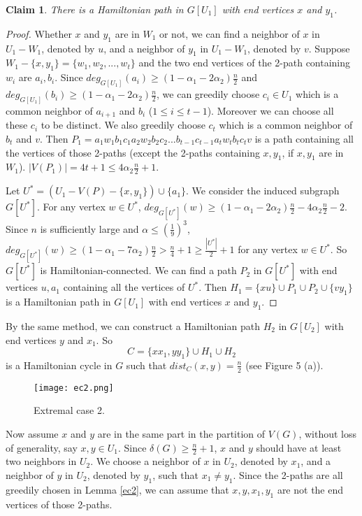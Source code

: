 \documentclass[11pt]{article}
\newtheorem{claim}[lemma]{Claim}
\begin{document}
\begin{claim}\label{hp}
There is a Hamiltonian path in $G[U_1]$ with end vertices $x$ and $y_1$.
\end{claim}
\begin{proof}
Whether $x$ and $y_1$ are in $W_1$ or not, we can find a neighbor of $x$ in $U_1-W_1$, denoted by $u$, and a neighbor of $y_1$ in $U_1-W_1$, denoted by $v$. Suppose $W_1-\{x,y_1\}=\{w_1, w_2,...,w_t\}$ and the two end vertices of the 2-path containing $w_i$ are $a_i,b_i$. Since $deg_{G[U_1]}(a_i)\geq (1-\alpha_1-2\alpha_2)\frac{n}{2}$ and $deg_{G[U_1]}(b_i)\geq (1-\alpha_1-2\alpha_2)\frac{n}{2}$, we can greedily choose $c_i\in U_1$ which is a common neighbor of $a_{i+1}$ and $b_i$ ($1\leq i\leq t-1$). Moreover we can choose all these $c_i$ to be distinct. We also greedily choose $c_t$ which is a common neighbor of $b_t$ and $v$. Then $P_1=a_1w_1b_1c_1a_2w_2b_2c_2...b_{t-1}c_{t-1}a_{t}w_{t}b_{t}c_{t}v$ is a path containing all the vertices of those 2-paths (except the 2-paths containing $x,y_1$, if $x,y_1$ are in $W_1$). $|V(P_1)|=4t+1\leq 4\alpha_2\frac{n}{2}+1$.

Let $U^*=(U_1-V(P)-\{x,y_1\})\cup \{a_1\}$. We consider the induced subgraph $G[U^*]$. For any vertex $w\in U^*$, $deg_{G[U^*]}(w)\geq (1-\alpha_1-2\alpha_2)\frac{n}{2}-4\alpha_2 \frac{n}{2}-2$. Since $n$ is sufficiently large and $\alpha \leq (\frac{1}{9})^3$, $deg_{G[U^*]}(w)\geq (1-\alpha_1-7\alpha_2)\frac{n}{2}>\frac{n}{4}+1\geq \frac{|U^*|}{2}+1$ for any vertex $w\in U^*$. So $G[U^*]$ is Hamiltonian-connected. We can find a path $P_2$ in $G[U^*]$ with end vertices $u,a_1$ containing all the vertices of $U^*$. Then $H_1=\{xu\}\cup P_1\cup P_2\cup \{vy_1\}$ is a Hamiltonian path in $G[U_1]$ with end vertices $x$ and $y_1$.
\end{proof}

By the same method, we can construct a Hamiltonian path $H_2$ in $G[U_2]$ with end vertices $y$ and $x_1$. So
$$C=\{xx_1,yy_1\}\cup H_1\cup H_2$$
is a Hamiltonian cycle in $G$ such that $dist_C(x,y)=\frac{n}{2}$ (see Figure 5 (a)).

\begin{figure}[htbp]
\centering
\texttt{[image: ec2.png]}
\caption{Extremal case 2.}
\end{figure}

Now assume $x$ and $y$ are in the same part in the partition of $V(G)$, without loss of generality, say $x,y\in U_1$. Since $\delta(G)\geq \frac{n}{2}+1$, $x$ and $y$ should have at least two neighbors in $U_2$. We choose a neighbor of $x$ in $U_2$, denoted by $x_1$, and a neighbor of $y$ in $U_2$, denoted by $y_1$, such that $x_1\not =y_1$. Since the 2-paths are all greedily chosen in Lemma \ref{ec2}, we can assume that $x,y,x_1,y_1$ are not the end vertices of those 2-paths.
\end{document}
